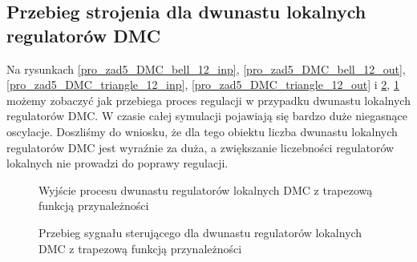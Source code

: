 \subsection{Przebieg strojenia dla dwunastu lokalnych regulatorów DMC}
Na rysunkach \ref{pro_zad5_DMC_bell_12_inp}, \ref{pro_zad5_DMC_bell_12_out}, \ref{pro_zad5_DMC_triangle_12_inp}, \ref{pro_zad5_DMC_triangle_12_out} i \ref{pro_zad5_DMC_trapezoid_12_inp}, \ref{pro_zad5_DMC_trapezoid_12_out} możemy zobaczyć jak przebiega proces regulacji w przypadku dwunastu lokalnych regulatorów DMC. W czasie całej symulacji pojawiają się bardzo duże niegasnące oscylacje. Doszliśmy do wniosku, że dla tego obiektu liczba dwunastu lokalnych regulatorów DMC jest wyraźnie za duża, a zwiększanie liczebności regulatorów lokalnych nie prowadzi do poprawy regulacji.  
\begin{figure}[t]
    \centering
    \caption{Wyjście procesu dwunastu regulatorów lokalnych DMC z trapezową funkcją przynależności}
    \label{pro_zad5_DMC_trapezoid_12_out}
\end{figure}

\begin{figure}[b]
    \centering
    \caption{Przebieg sygnału sterującego dla dwunastu regulatorów lokalnych DMC z trapezową funkcją przynależności}
    \label{pro_zad5_DMC_trapezoid_12_inp}
\end{figure}


